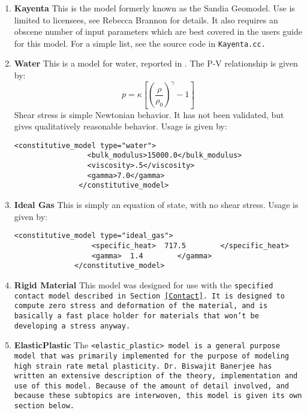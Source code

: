 \begin{enumerate}
\item{\bf Kayenta} This is the model formerly known as the Sandia Geomodel.  Use
is limited to licensees, see Rebecca Brannon for details.  It also requires
an obscene number of input parameters which are best covered in the users
guide for this model.  For a simple list, see the source code in
\tt Kayenta.cc. \normalfont

\item{\bf Water}  This is a model for water, reported in \cite{water_model_ref}.
The P-V relationship is given by:
\begin{equation}
p=\kappa\left[\left(\frac{\rho}{\rho_0}\right)^{\gamma} - 1\right]
\end{equation}
Shear stress is simple Newtonian behavior.  It has not been validated,
but gives qualitatively reasonable behavior.  Usage is given by:
\begin{Verbatim}[fontsize=\footnotesize]
              <constitutive_model type="water">
                 <bulk_modulus>15000.0</bulk_modulus>
                 <viscosity>.5</viscosity>
                 <gamma>7.0</gamma>
               </constitutive_model>
\end{Verbatim}

\item{\bf Ideal Gas}  This is simply an equation of state, with no shear stress.
Usage is given by:

\begin{Verbatim}[fontsize=\footnotesize]
              <constitutive_model type="ideal_gas">
                  <specific_heat>  717.5        </specific_heat>
                  <gamma>  1.4        </gamma>
              </constitutive_model>
\end{Verbatim}

\item{\bf Rigid Material}  This model was designed for use with the
\tt specified \normalfont contact model described in Section~\ref{Contact}.
It is designed to compute zero stress and deformation of the material,
and is basically a fast place holder for materials that won't be developing
a stress anyway.

\item{\bf ElasticPlastic} The \tt <elastic\_plastic> \normalfont model is a
general purpose model that was primarily implemented for the purpose of
modeling high strain rate metal plasticity.  Dr. Biswajit Banerjee has
written an extensive description of the theory, implementation and use of
this model.  Because of the amount of detail involved, and because these
subtopics are interwoven, this model is given its own section below.

\end{enumerate}


